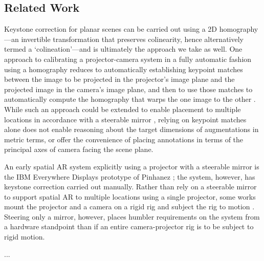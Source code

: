 \documentclass[review]{elsarticle}
\begin{document}
\subsection{Related Work}

Keystone correction for planar scenes can be carried out using a 2D homography \cite{Hartley2004}---an invertible transformation that preserves colinearity, hence alternatively termed a `colineation'---and is ultimately the approach we take as well. One approach to calibrating a projector-camera system in a fully automatic fashion using a homography reduces to automatically establishing keypoint matches between the image to be projected in the projector's image plane and the projected image in the camera's image plane, and then to use those matches to automatically compute the homography that warps the one image to the other \cite{sukthankar2001smarter}. While such an approach could be extended to enable placement to multiple locations in accordance with a steerable mirror \cite{okatani2005autocalibration}, relying on keypoint matches alone does not enable reasoning about the target dimensions of augmentations in metric terms, or offer the convenience of placing annotations in terms of the principal axes of camera facing the scene plane.

An early spatial AR system explicitly using a projector with a steerable mirror is the IBM Everywhere Displays prototype of Pinhanez \cite{pinhanez2001everywhere}; the system, however, has keystone correction carried out manually. Rather than rely on a steerable mirror to support spatial AR to multiple locations using a single projector, some works mount the projector and a camera on a rigid rig and subject the rig to motion \cite{ehnes2004projected,borkowski2004spatial,butz2006applying}. Steering only a mirror, however, places humbler requirements on the system from a hardware standpoint than if an entire camera-projector rig is to be subject to rigid motion.

...

\end{document}
